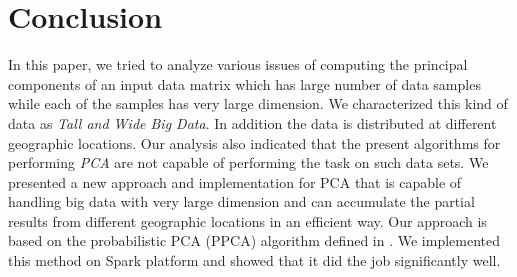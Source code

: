 \documentclass[10pt,conference,letterpaper]{IEEEtran}
\begin{document}
\section{Conclusion}
In this paper, we tried to analyze various issues of computing the principal components of an input data matrix which has large number of data samples while each of the samples has very large dimension. We characterized this kind of data as \textit{Tall and Wide Big Data}. In addition the data is distributed at different geographic locations. Our analysis also indicated that the present algorithms for performing \textit{PCA} are not capable of performing the task on such data sets. We presented a new approach and implementation for PCA that is capable of handling big data with very large dimension and can accumulate the partial results from different geographic locations in an efficient way. Our approach is based on the probabilistic PCA (PPCA) algorithm defined in \cite{bishop}. We implemented this method on Spark platform and showed that it did the job significantly well.  


%


\end{document}
